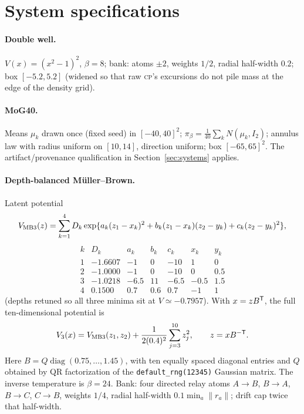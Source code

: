 \documentclass[11pt]{article}
\newcommand{\piB}{\pi_\beta}
\begin{document}
\section{System specifications}
\label{app:specs}

\paragraph{Double well.}  $V(x)=(x^2-1)^2$, $\beta=8$; bank: atoms $\pm2$,
weights $1/2$, radial half-width $0.2$; box $[-5.2,5.2]$ (widened so that raw
\textsc{cp}'s excursions do not pile mass at the edge of the density grid).

\paragraph{MoG40.}  Means $\mu_k$ drawn once (fixed seed) in $[-40,40]^2$;
$\piB=\frac1{40}\sum_k N(\mu_k,I_2)$; annulus law with radius uniform on
$[10,14]$, direction uniform; box $[-65,65]^2$.  The artifact/provenance
qualification in Section~\ref{sec:systems} applies.

\paragraph{Depth-balanced M\"uller--Brown.}  Latent potential
\begin{equation}
 V_{\rm MB3}(z)=\sum_{k=1}^4D_k
 \exp\{a_k(z_1-x_k)^2+b_k(z_1-x_k)(z_2-y_k)+c_k(z_2-y_k)^2\},
\end{equation}
\begin{equation*}
\begin{array}{c|rrrrrr}
k&D_k&a_k&b_k&c_k&x_k&y_k\\\hline
1&-1.6607&-1&0&-10&1&0\\
2&-1.0000&-1&0&-10&0&0.5\\
3&-1.0218&-6.5&11&-6.5&-0.5&1.5\\
4& 0.1500& 0.7&0.6&0.7&-1&1
\end{array}
\end{equation*}
(depths retuned so all three minima sit at $V\simeq-0.7957$).  With
$x=zB^{\sf T}$, the full ten-dimensional potential is
\begin{equation}
 V_3(x)=V_{\rm MB3}(z_1,z_2)
 +\frac{1}{2(0.4)^2}\sum_{j=3}^{10}z_j^2,\qquad
 z=xB^{-{\sf T}}.
\end{equation}
Here $B=Q\operatorname{diag}(0.75,\ldots,1.45)$, with ten equally spaced
diagonal entries and $Q$ obtained by QR factorization of the
\texttt{default\_rng(12345)} Gaussian matrix.  The inverse temperature is
$\beta=24$.  Bank: four directed relay atoms
$A\to B$, $B\to A$, $B\to C$, $C\to B$, weights $1/4$, radial half-width
$0.1\min_a\lVert r_a\rVert$; drift cap twice that half-width.
\end{document}
